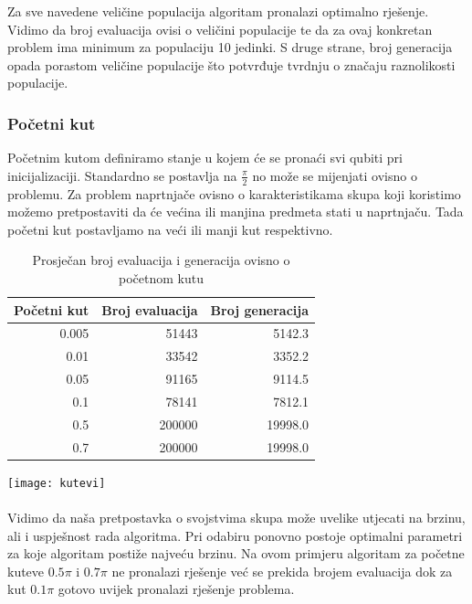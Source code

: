 \documentclass[times, utf8, zavrsni, numeric]{fer}
\begin{document}
Za sve navedene veličine populacija algoritam pronalazi optimalno rješenje. Vidimo da broj evaluacija ovisi o veličini populacije te da za ovaj konkretan problem ima minimum za populaciju 10 jedinki. S druge strane, broj generacija opada porastom veličine populacije što potvrđuje tvrdnju o značaju raznolikosti populacije.

\subsubsection{Početni kut}
Početnim kutom definiramo stanje u kojem će se pronaći svi qubiti pri inicijalizaciji. Standardno se postavlja na $\frac{\pi}{2}$ no može se mijenjati ovisno o problemu. Za problem naprtnjače ovisno o karakteristikama skupa koji koristimo možemo pretpostaviti da će većina ili manjina predmeta stati u naprtnjaču. Tada početni kut postavljamo na veći ili manji kut respektivno.

\begin{table}[htb]
\caption{Prosječan broj evaluacija i generacija ovisno o početnom kutu}
\centering
\begin{tabular}{rrr} \hline
Početni kut & Broj evaluacija & Broj generacija \\ 
\hline
0.005 &	51443	& 5142.3 \\
0.01 & 	33542 & 	3352.2 \\
0.05 &	 91165 & 	9114.5 \\
0.1 &	78141 &	7812.1 \\
0.5 &	200000 &	19998.0 \\
0.7 &	200000 &	19998.0 \\
\hline
\end{tabular}
\end{table}

\begin{center}
\texttt{[image: kutevi]}
\end{center}

\paragraph{}
Vidimo da naša pretpostavka o svojstvima skupa može uvelike utjecati na brzinu, ali i uspješnost rada algoritma. Pri odabiru ponovno postoje optimalni parametri za koje algoritam postiže najveću brzinu. Na ovom primjeru algoritam za početne kuteve $0.5 \pi$ i $0.7 \pi$ ne pronalazi rješenje već se prekida brojem evaluacija dok za kut $0.1 \pi$ gotovo uvijek pronalazi rješenje problema.
\end{document}
